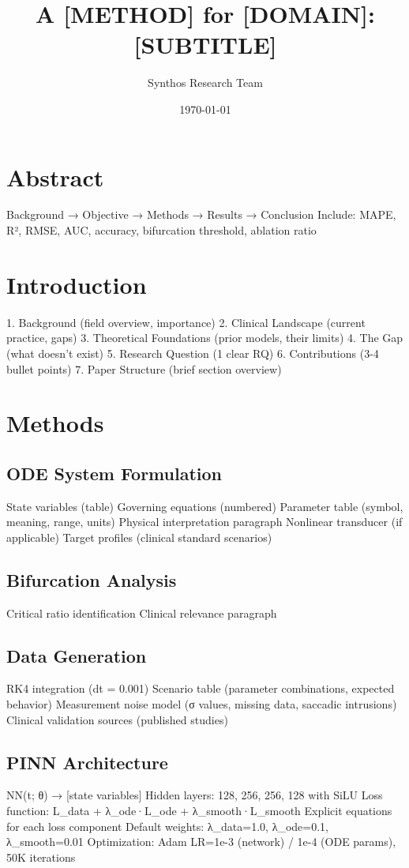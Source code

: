 \documentclass[12pt]{article}
\title{A [METHOD] for [DOMAIN]: [SUBTITLE]}
\author{Synthos Research Team}
\date{\today}
\begin{document}
\maketitle

\section{Abstract}
  Background → Objective → Methods → Results → Conclusion
  Include: MAPE, R², RMSE, AUC, accuracy, bifurcation threshold, ablation ratio

\section{Introduction}
  1. Background (field overview, importance)
  2. Clinical Landscape (current practice, gaps)
  3. Theoretical Foundations (prior models, their limits)
  4. The Gap (what doesn't exist)
  5. Research Question (1 clear RQ)
  6. Contributions (3-4 bullet points)
  7. Paper Structure (brief section overview)

\section{Methods}
  \subsection{ODE System Formulation}
    State variables (table)
    Governing equations (numbered)
    Parameter table (symbol, meaning, range, units)
    Physical interpretation paragraph
    Nonlinear transducer (if applicable)
    Target profiles (clinical standard scenarios)

  \subsection{Bifurcation Analysis}
    Critical ratio identification
    Clinical relevance paragraph

  \subsection{Data Generation}
    RK4 integration (dt = 0.001)
    Scenario table (parameter combinations, expected behavior)
    Measurement noise model (σ values, missing data, saccadic intrusions)
    Clinical validation sources (published studies)

  \subsection{PINN Architecture}
    NN(t; θ) → [state variables]
    Hidden layers: 128, 256, 256, 128 with SiLU
    Loss function: L_data + λ_ode·L_ode + λ_smooth·L_smooth
    Explicit equations for each loss component
    Default weights: λ_data=1.0, λ_ode=0.1, λ_smooth=0.01
    Optimization: Adam LR=1e-3 (network) / 1e-4 (ODE params), 50K iterations
\end{document}
